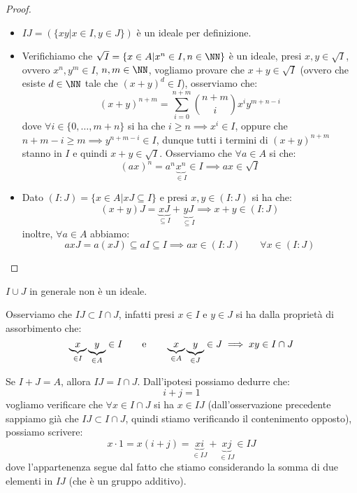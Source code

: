 \documentclass[11pt]{scrartcl}
\begin{document}
\begin{proof}
\begin{itemize}
        \item $IJ = (\{xy | x \in I, y \in J\})$ è un ideale per definizione.
        \item Verifichiamo che $\sqrt{I} = \{x \in A | x^n \in I, n \in \NN\}$ è un ideale, presi $x,y \in \sqrt{I}$, ovvero $x^n,y^m \in I$, $n,m \in \NN$, vogliamo 
            provare che $x + y \in \sqrt{I}$ (ovvero che esiste $d \in \NN$ tale che $(x+y)^d \in I$), osserviamo che:
                \[ (x + y)^{n + m} = \sum_{i = 0}^{n + m} \binom{n+m}{i} x^i y^{m+n-i}
                    \]
            dove $\forall i \in \{0,\ldots,m+n\}$ si ha che $i \geq n \implies x^i \in I$, oppure che $n+m-i \geq m \implies y^{n+m-i} \in I$, dunque tutti i termini di $(x+y)^{n+m}$ stanno in $I$
            e quindi $x + y \in \sqrt{I}$. Osserviamo che $\forall a \in A$ si che:
                \[ (ax)^n = a^n\underbrace{x^n}_{\in I} \in I \implies ax \in \sqrt{I}
                    \]
        \item Dato $(I : J) = \{x \in A | xJ \subseteq I\}$ e presi $x,y \in (I : J)$ si ha che:
            \[ (x+y)J = \underbrace{xJ}_{\subseteq I} + \underbrace{yJ}_{\subseteq I} \implies x+y \in (I:J)
                \]
        inoltre, $\forall a \in A$ abbiamo:
            \[ axJ = a(xJ) \subseteq aI \subseteq I \implies ax \in (I:J) \qquad \forall x \in (I:J)
                \]
    \end{itemize}
\end{proof}

\begin{remark}[$I \cup J$]
    $I \cup J$ in generale non è un ideale.
\end{remark}

\begin{remark}
    Osserviamo che $IJ \subset I \cap J$, infatti presi $x \in I$ e $y \in J$ si ha dalla proprietà di assorbimento che:
        \[ \underbrace{x}_{\in I}\underbrace{y}_{\in A} \in I \qquad \text e \qquad \underbrace{x}_{\in A}\underbrace{y}_{\in J} \in  J \implies xy \in I \cap J
            \]
\end{remark}

\begin{remark}[$IJ = I \cap J$]
    \label{2.24}
    Se $I + J = A$, allora $IJ = I \cap J$. Dall'ipotesi possiamo dedurre che:
        \[ i+j = 1
            \]
    vogliamo verificare che $\forall x \in I \cap J$ si ha $x \in IJ$ (dall'osservazione precedente 
    sappiamo già che $IJ \subset I \cap J$, quindi stiamo verificando il contenimento opposto), possiamo scrivere:
        \[ x \cdot 1 = x(i+j) = \underbrace{xi}_{\in IJ} + \underbrace{xj}_{\in IJ} \in IJ
            \]
    dove l'appartenenza segue dal fatto che stiamo considerando la somma di due elementi in $IJ$ (che è un gruppo additivo).
\end{remark}
\end{document}
